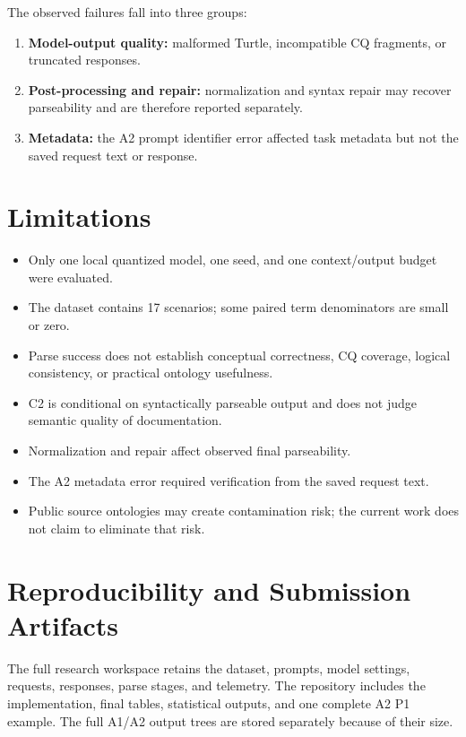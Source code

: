 \documentclass[11pt,a4paper]{article}
\begin{document}
The observed failures fall into three groups:

\begin{enumerate}
  \item \textbf{Model-output quality:} malformed Turtle, incompatible CQ
  fragments, or truncated responses.
  \item \textbf{Post-processing and repair:} normalization and syntax repair
  may recover parseability and are therefore reported separately.
  \item \textbf{Metadata:} the A2 prompt identifier error affected task
  metadata but not the saved request text or response.
\end{enumerate}

\section{Limitations}

\begin{itemize}
  \item Only one local quantized model, one seed, and one context/output budget
  were evaluated.
  \item The dataset contains 17 scenarios; some paired term denominators are
  small or zero.
  \item Parse success does not establish conceptual correctness, CQ coverage,
  logical consistency, or practical ontology usefulness.
  \item C2 is conditional on syntactically parseable output and does not judge
  semantic quality of documentation.
  \item Normalization and repair affect observed final parseability.
  \item The A2 metadata error required verification from the saved request text.
  \item Public source ontologies may create contamination risk; the current work
  does not claim to eliminate that risk.
\end{itemize}

\section{Reproducibility and Submission Artifacts}

The full research workspace retains the dataset, prompts, model settings,
requests, responses, parse stages, and telemetry. The repository includes the
implementation, final tables, statistical outputs, and one complete A2 P1
example. The full A1/A2 output trees are stored separately because of their
size.
\end{document}
